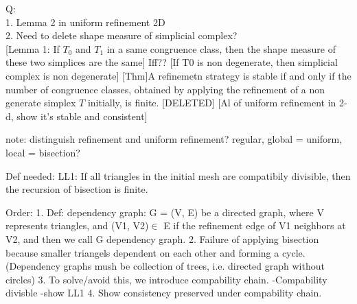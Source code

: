\documentclass[english]{article}
\begin{document}
    Q:\\
    1. Lemma 2 in uniform refinement 2D\\
    2. Need to delete shape measure of simplicial complex?\\
   

    [Lemma 1: If $T_0$ and $T_1$ in a same congruence class, then the shape measure of these two simplices are the same] Iff??
    [If T0 is non degenerate, then simplicial complex is non degenerate]
    [Thm]A refinemetn strategy is stable if and only if the number of congruence classes, obtained by applying the refinement of a non generate simplex $T$ initially, is finite. [DELETED]
    [Al of uniform refinement in 2-d, show it's stable and consistent]

    note: distinguish refinement and uniform refinement? regular, global = uniform, local = bisection?

    Def needed: 
    LL1: If all triangles in the initial mesh are compatibily divisible, then the recursion of bisection is finite.

    Order:
    1. Def: dependency graph: 
    G  = (V, E) be a directed graph, where V represents triangles, and (V1, V2)$\in$ E if the refinement edge of V1 neighbors at V2, and then we call G dependency graph.
    2. Failure of applying bisection because smaller triangels dependent on each other and forming a cycle.(Dependency graphs mush be collection of trees, i.e. directed graph without circles)
    3. To solve/avoid this, we introduce compability chain. 
    -Compability divisble
    -show LL1
    4. Show consistency preserved under compability chain.
    




\end{document}
